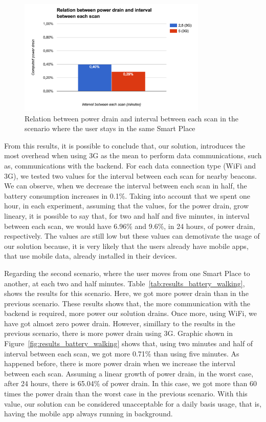 

\begin{figure}[!ht]
  \centering
    \includegraphics[width=0.8\textwidth, keepaspectratio]{images/results_battery_stopped}
    \caption[Power drain when the user does not move]{Relation between power drain and interval between each scan in the scenario where the user stays in the same Smart Place}
    \label{fig:results_battery_stopped}
\end{figure}

From this results, it is possible to conclude that, our solution, introduces the most overhead when using \gls{3G} as the mean to perform data communications, such as, communications with the backend.
For each data connection type (\gls{WiFi} and \gls{3G}), we tested two values for the interval between each scan for nearby beacons.
We can observe, when we decrease the interval between each scan in half, the battery consumption increases in 0.1\%.
Taking into account that we spent one hour, in each experiment, assuming that the values, for the power drain, grow lineary, it is possible to say that, for two and half and five minutes, in interval between each scan, we would have 6.96\% and 9.6\%, in 24 hours, of power drain, respectively.
The values are still low but these values can demotivate the usage of our solution because, it is very likely that the users already have mobile apps, that use mobile data, already installed in their devices.

Regarding the second scenario, where the user moves from one Smart Place to another, at each two and half minutes.
Table~\ref{tab:results_battery_walking}, shows the results for this scenario. Here, we got more power drain than in the previous scenario.
These results shows that, the more communication with the backend is required, more power our solution drains.
Once more, using \gls{WiFi}, we have got almost zero power drain.
However, simillary to the results in the previous scenario, there is more power drain using \gls{3G}.
Graphic shown in Figure~\ref{fig:results_battery_walking} shows that, using two minutes and half of interval between each scan, we got more 0.71\% than using five minutes.
As happened before, there is more power drain when we increase the interval between each scan.
Assuming a linear growth of power drain, in the worst case, after 24 hours, there is 65.04\% of power drain.
In this case, we got more than 60 times the power drain than the worst case in the previous scenario.
With this value, our solution can be considered unacceptable for a daily basis usage, that is, having the mobile app always running in background.

